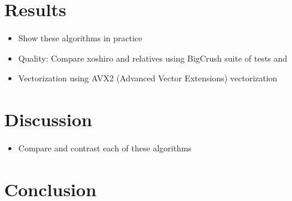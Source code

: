 \documentclass{article}
\begin{document}
    \section*{Results}

        \begin{itemize}
            \item Show these algorithms in practice
            \item Quality\cite{Shootout}: Compare xoshiro and relatives using BigCrush suite of tests\cite{TestU01} and\cite{HammingWeightDependencies}
            \item Vectorization using AVX2 (Advanced Vector Extensions) vectorization\cite{Shootout}
        \end{itemize}

    \section*{Discussion}

        \begin{itemize}
            \item Compare and contrast each of these algorithms
        \end{itemize}

    \section*{Conclusion}

    \printbibliography
\end{document}
